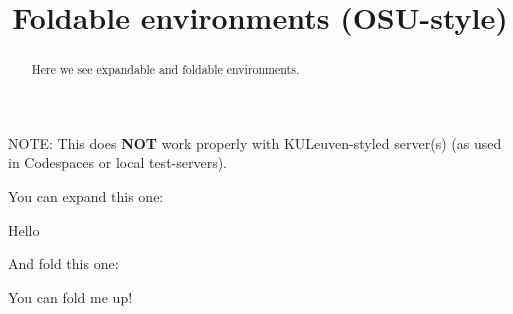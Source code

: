 \documentclass{ximera}
\title{Foldable environments (OSU-style)}
\begin{document}
\begin{abstract}
  Here we see expandable and foldable environments.
\end{abstract}
\maketitle

NOTE: This does \textbf{NOT} work properly with KULeuven-styled server(s) (as used in Codespaces or local test-servers).


You can expand this one:

\begin{expandable}
  Hello
 \begin{center}
 \end{center}
\end{expandable}



And fold this one:

\begin{foldable}
  You can fold me up!
\end{foldable}
\end{document}
